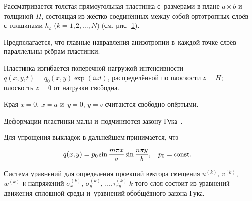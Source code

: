


\date{30/XII/2010} %







\maketitle






Рассматривается толстая прямоугольная пластинка с~размерами в плане $a\times b$ и толщиной $H$, состоящая из жёстко соединённых между собой ортотропных слоёв с толщинами $h_k$ ($k = 1, 2, \dots, N $) (см. рис.~\hyperlink{fig:ned:1}{1}).





Предполагается, что главные направления анизотропии в~каждой точке слоёв параллельны рёбрам пластинки. 

Пластинка изгибается поперечной нагрузкой интенсивности $q(x, y, t)=q_0(x, y)\exp(i\omega t)$, распределённой по плоскости $z=H$; плоскость $z=0$ от нагрузки свободна. 

Края $x=0$, $x=a$ и~$y=0$, $y=b$ считаются свободно опёртыми. 

Деформации пластинки малы и~подчиняются закону Гука~\cite{ned1}.



Для упрощения выкладок в дальнейшем принимается, что

\begin{equation*}

q(x, y)=p_0\sin\frac{ m\pi x }{a}\sin\frac{n\pi y}{b},\quad p_0=\rm const.


\end{equation*}





Система уравнений для определения проекций вектора смещения $u^{(k)}$, $v^{(k)}$, $w^{(k)}$ и напряжений $\sigma_x^{(k)}$, $\sigma_y^{(k)}$, $\ldots$,$\tau_{xy}^{(k)}$  $k$-того слоя состоит  из уравнений движения сплошной среды и~уравнений обобщённого закона Гука.



